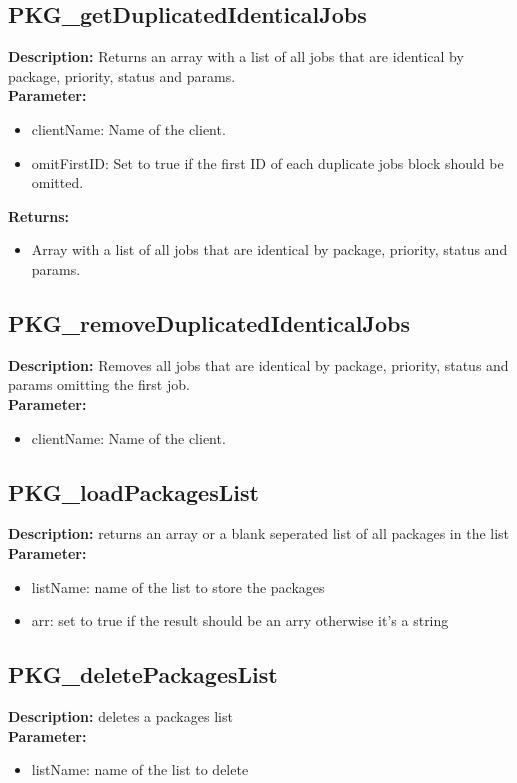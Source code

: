 \subsection{PKG\_getDuplicatedIdenticalJobs}
\textbf{Description:} Returns an array with a list of all jobs that are identical by package, priority, status and params.\\
\textbf{Parameter:}
\begin{itemize}
\item clientName: Name of the client.
\item omitFirstID: Set to true if the first ID of each duplicate jobs block should be omitted.
\end{itemize}
\textbf{Returns:}
\begin{itemize}
\item Array with a list of all jobs that are identical by package, priority, status and params.
\end{itemize}

\subsection{PKG\_removeDuplicatedIdenticalJobs}
\textbf{Description:} Removes all jobs that are identical by package, priority, status and params omitting the first job.\\
\textbf{Parameter:}
\begin{itemize}
\item clientName: Name of the client.
\end{itemize}

\subsection{PKG\_loadPackagesList}
\textbf{Description:} returns an array or a blank seperated list of all packages in the list\\
\textbf{Parameter:}
\begin{itemize}
\item listName: name of the list to store the packages 
\item arr: set to true if the result should be an arry otherwise it's a string
\end{itemize}

\subsection{PKG\_deletePackagesList}
\textbf{Description:} deletes a packages list\\
\textbf{Parameter:}
\begin{itemize}
\item listName: name of the list to delete
\end{itemize}

